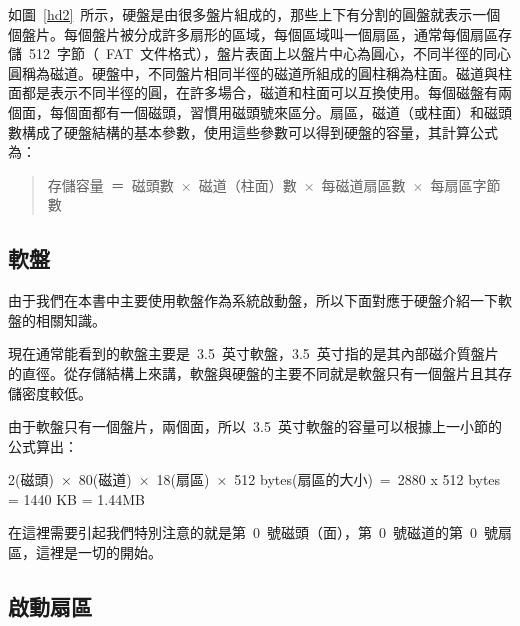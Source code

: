 如圖~\ref{hd2}~所示，硬盤是由很多盤片組成的，那些上下有分割的圓盤就表示一個個盤片。每個盤片被分成許多扇形的區域，每個區域叫一個扇區，通常每個扇區存儲~512~字節（~FAT~文件格式），盤片表面上以盤片中心為圓心，不同半徑的同心圓稱為磁道。硬盤中，不同盤片相同半徑的磁道所組成的圓柱稱為柱面。磁道與柱面都是表示不同半徑的圓，在許多場合，磁道和柱面可以互換使用。每個磁盤有兩個面，每個面都有一個磁頭，習慣用磁頭號來區分。扇區，磁道（或柱面）和磁頭數構成了硬盤結構的基本參數，使用這些參數可以得到硬盤的容量，其計算公式為：
\begin{quote}
存儲容量~＝~磁頭數~×~磁道（柱面）數~×~每磁道扇區數~×~每扇區字節數
\end{quote}


\subsection{軟盤}
由于我們在本書中主要使用軟盤作為系統啟動盤，所以下面對應于硬盤介紹一下軟盤的相關知識。


現在通常能看到的軟盤主要是~3.5~英寸軟盤，3.5~英寸指的是其內部磁介質盤片的直徑。從存儲結構上來講，軟盤與硬盤的主要不同就是軟盤只有一個盤片且其存儲密度較低。

由于軟盤只有一個盤片，兩個面，所以~3.5~英寸軟盤的容量可以根據上一小節的公式算出：

2(磁頭)~×~80(磁道)~×~18(扇區)~×~512 bytes(扇區的大小)~=~2880 x 512 bytes = 1440 KB = 1.44MB

在這裡需要引起我們特別注意的就是第~0~號磁頭（面），第~0~號磁道的第~0~號扇區，這裡是一切的開始。

\subsection{啟動扇區}

